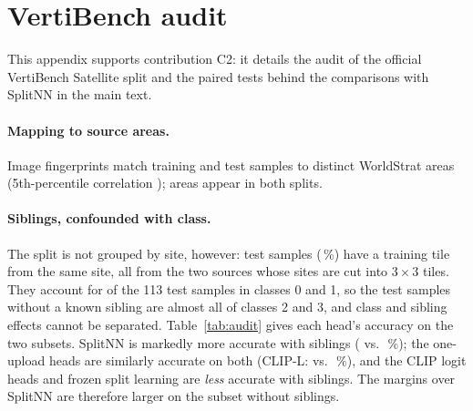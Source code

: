 \FloatBarrier

\section{VertiBench audit}\label{app:audit}

This appendix supports contribution C2: it details the audit of the official VertiBench Satellite split and the paired tests behind the comparisons with SplitNN in the main text.

\paragraph{Mapping to source areas.}
Image fingerprints match \auMapTrain{} training and \auMapTest{} test samples to distinct WorldStrat areas (5th-percentile correlation \auScore); \auMapOverlap{} areas appear in both splits.

\paragraph{Siblings, confounded with class.}
The split is not grouped by site, however: \auSibN{} test samples (\auSibShare\,\%) have a training tile from the same site, all from the two sources whose sites are cut into $3\times3$ tiles. They account for \auSibN{} of the 113 test samples in classes 0 and 1, so the \auNoSibN{} test samples without a known sibling are almost all of classes 2 and 3, and class and sibling effects cannot be separated. Table~\ref{tab:audit} gives each head's accuracy on the two subsets. SplitNN is markedly more accurate with siblings (\auSnSib{} vs.\ \auSnNoSib\,\%); the one-upload heads are similarly accurate on both (CLIP-L: \auClipSib{} vs.\ \auClipNoSib\,\%), and the CLIP logit heads and frozen split learning are \emph{less} accurate with siblings. The margins over SplitNN are therefore larger on the subset without siblings.

